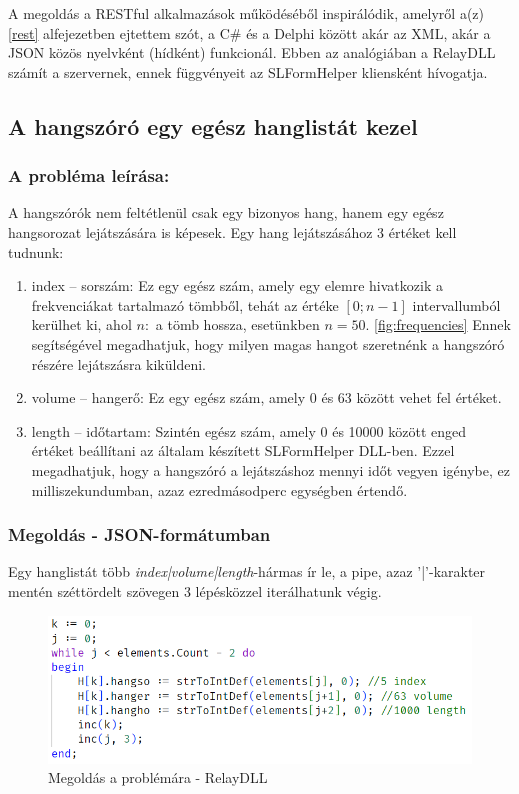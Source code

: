 \documentclass[tocnopagenum]{thesis-ekf}
\theoremstyle{definition}
\theoremstyle{remark}
\begin{document}
	A megoldás a RESTful alkalmazások működéséből inspirálódik, amelyről a(z) \ref{rest} alfejezetben ejtettem szót, a C\# és a Delphi között akár az XML, akár a JSON közös nyelvként (hídként) funkcionál. Ebben az analógiában a RelayDLL számít a szervernek, ennek függvényeit az SLFormHelper kliensként hívogatja.
	\subsection{A hangszóró egy egész hanglistát kezel}
	\subsubsection{A probléma leírása:} A hangszórók nem feltétlenül csak egy bizonyos hang, hanem egy egész hangsorozat lejátszására is képesek. Egy hang lejátszásához 3 értéket kell tudnunk:
	\begin{enumerate}
		\item index -- sorszám: Ez egy egész szám, amely egy elemre hivatkozik a frekvenciákat tartalmazó tömbből, tehát az értéke $[0;n-1]$ intervallumból kerülhet ki, ahol $n: $ a tömb hossza, esetünkben $n=50$. \ref{fig:frequencies} Ennek segítségével megadhatjuk, hogy milyen magas hangot szeretnénk a hangszóró részére lejátszásra kiküldeni.
		\item volume -- hangerő: Ez egy egész szám, amely 0 és 63 között vehet fel értéket.
		\item length -- időtartam: Szintén egész szám, amely 0 és 10000 között enged értéket beállítani az általam készített SLFormHelper DLL-ben. Ezzel megadhatjuk, hogy a hangszóró a lejátszáshoz mennyi időt vegyen igénybe, ez milliszekundumban, azaz ezredmásodperc egységben értendő.
	\end{enumerate}
	\subsubsection{Megoldás - JSON-formátumban}
	Egy hanglistát több \textit{index|volume|length}-hármas ír le, a pipe, azaz '|'-karakter mentén széttördelt szövegen 3 lépésközzel iterálhatunk végig.
	
	\begin{figure}[h!]
		\centering
		\includegraphics{speaker_solved}
		\caption{Megoldás a problémára - RelayDLL}
		\label{speaker_solved}
	\end{figure}
\end{document}
